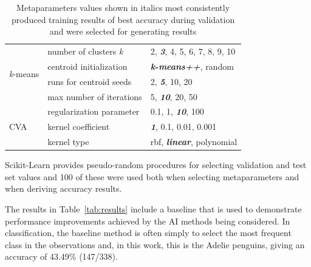 \documentclass[12pt]{article}
\begin{document}
\begin{table}
\begin{center}
\begin{tabular}{l|l|l}
  \hline
  \multirow{4}{*}{\textit{k}-means} & number of clusters \textit{k}  & 2, \textit{\textbf{3}}, 4, 5, 6, 7, 8, 9, 10 \\
                                    & centroid initialization         & \textit{\textbf{k-means++}}, random \\
                                    & runs for centroid seeds	     & 2, \textit{\textbf{5}}, 10, 20 \\
                                    & max number of iterations           & 5, \textit{\textbf{10}}, 20, 50 \\
  \hline
    \multirow{3}{*}{CVA}            & regularization parameter  & 0.1, 1, \textit{\textbf{10}}, 100 \\
                                    & kernel coefficient      & \textit{\textbf{1}}, 0.1, 0.01, 0.001 \\
                                    & kernel type                  & rbf, \textit{\textbf{linear}}, polynomial \\
  \hline
  \end{tabular}
  \vspace{-1.5\baselineskip} %
  \end{center} 
  \caption{Metaparameters values shown in italics most consistently produced training results of 
  best accuracy during validation and were selected for generating results}
  \vspace{-1\baselineskip} %
  \label{tab:metaparameters}
\end{table} 

Scikit-Learn provides pseudo-random procedures for selecting validation and test set values and 100 of these were used 
both when selecting metaparameters and when deriving accuracy results.

The results in Table~\ref{tab:results} include a baseline that is used to demonstrate performance improvements achieved by the AI methods being considered. 
In classification, the baseline method is often simply to select the most frequent class in the observations and, 
in this work, this is the Adelie penguins, giving an accuracy of 43.49\% (147/338).
\end{document}
